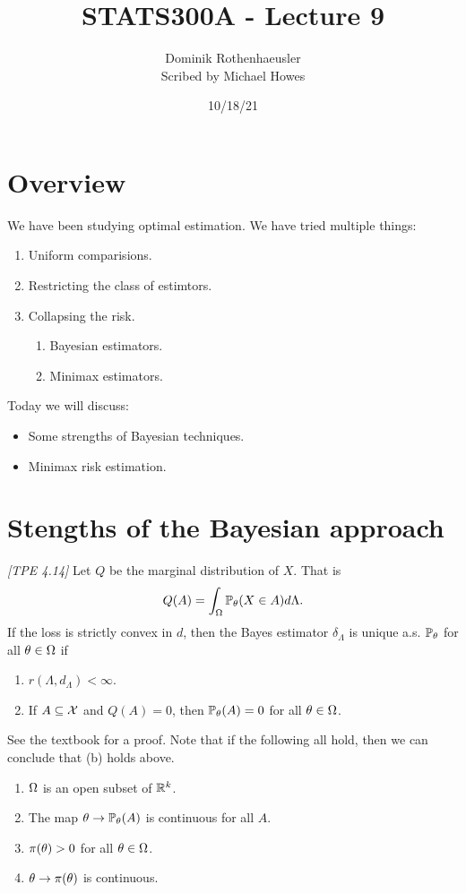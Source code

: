 




\title{STATS300A - Lecture 9}
\author{Dominik Rothenhaeusler\\ Scribed by Michael Howes}
\date{10/18/21}

\pagestyle{fancy}
\fancyhf{}


\maketitle
\tableofcontents
\section{Overview}
We have been studying optimal estimation. We have tried multiple things:
\begin{enumerate}
    \item Uniform comparisions.
    \item Restricting the class of estimtors.
    \item Collapsing the risk.\begin{enumerate}
        \item Bayesian estimators.
        \item Minimax estimators.
    \end{enumerate}
\end{enumerate}
Today we will discuss:
\begin{itemize}
    \item Some strengths of Bayesian techniques.
    \item Minimax risk estimation.
\end{itemize}
\section{Stengths of the Bayesian approach}
\begin{lemma}
    \emph{[TPE 4.14]} Let $Q$ be the marginal distribution of $X$. That is
    \[Q(A) = \int_{{\Omega}} {\mathbb{P}}_{\theta}(X\in A)d\Lambda. \]
    If the loss is strictly convex in $d$, then the Bayes estimator $\delta_\Lambda$ is unique a.s. ${\mathbb{P}}_{\theta}$ for all ${\theta} \in {{\Omega}}$ if
    \begin{enumerate}
        \item $r(\Lambda, d_\Lambda) < \infty$.
        \item If $A \subseteq {\mathcal{X}}$ and $Q(A) = 0$, then ${\mathbb{P}}_{\theta}(A) = 0$ for all ${\theta} \in {{\Omega}}$.
    \end{enumerate}
\end{lemma}
See the textbook for a proof. Note that if the following all hold, then we can conclude that (b) holds above.
\begin{enumerate}
    \item ${{\Omega}}$ is an open subset of ${\mathbb R}^k$.
    \item The map ${\theta} \to {\mathbb{P}}_{\theta}(A)$ is continuous for all $A$.
    \item $\pi({\theta}) > 0$ for all ${\theta} \in {{\Omega}}$.
    \item ${\theta} \to \pi({\theta})$ is continuous.
\end{enumerate}
